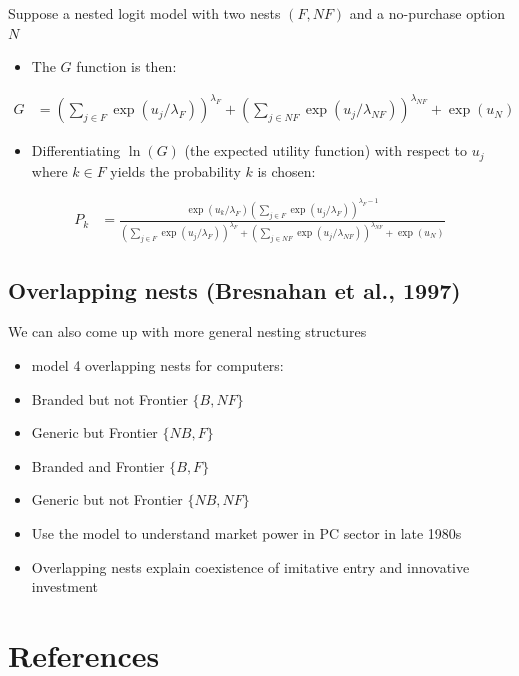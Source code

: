 \documentclass[11pt]{article}
\begin{document}
Suppose a nested logit model with two nests \((F,NF)\) and a no-purchase option \(N\)

\begin{itemize}
\item The \(G\) function is then:
\end{itemize}
\begin{align*}
G&=\left(\sum_{j\in F}\exp(u_j/\lambda_F)\right)^{\lambda_F}+\left(\sum_{j\in NF}\exp(u_j/\lambda_{NF})\right)^{\lambda_{NF}}+\exp(u_N)
\end{align*}

\begin{itemize}
\item Differentiating \(\ln(G)\) (the expected utility function) with respect to \(u_j\) where \(k\in F\) yields the probability \(k\) is chosen:
\end{itemize}

\begin{align*}
P_k&=\frac{\exp(u_k/\lambda_F)\left(\sum_{j\in F}\exp(u_j/\lambda_F)\right)^{\lambda_F-1}}{\left(\sum_{j\in F}\exp(u_j/\lambda_F)\right)^{\lambda_F}+\left(\sum_{j\in NF}\exp(u_j/\lambda_{NF})\right)^{\lambda_{NF}}+\exp(u_N)}
\end{align*}

\subsection{Overlapping nests (Bresnahan et al., 1997)}
\label{sec:org77e54ff}

We can also come up with more general nesting structures

\begin{itemize}
\item \textcite{bst1997} model 4 overlapping nests for computers:

\item Branded but not Frontier \(\{B,NF\}\)
\item Generic but Frontier  \(\{NB,F\}\)
\item Branded and Frontier  \(\{B,F\}\)
\item Generic but not Frontier  \(\{NB,NF\}\)

\item Use the model to understand market power in PC sector in late 1980s

\item Overlapping nests explain coexistence of imitative entry and innovative investment
\end{itemize}


\section*{References}
\label{sec:org3abb94f}
\printbibliography
\end{document}
